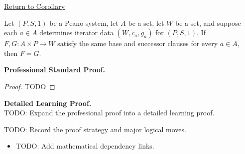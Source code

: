 \newpage
{}
\label{prf:uniqueness-of-binary-iterator-operations}

\begin{remark*}[Return]
\hyperref[cor:uniqueness-of-binary-iterator-operations]{Return to Corollary}
\end{remark*}

\begin{theorem*}
Let $(P,S,1)$ be a Peano system, let $A$ be a set, let $W$ be a set, and
suppose each $a\in A$ determines iterator data $(W,c_a,g_a)$ for $(P,S,1)$.
If $F,G:A\times P\to W$ satisfy the same base and successor clauses for every
$a\in A$, then $F=G$.
\end{theorem*}

\textbf{Professional Standard Proof.}~\\
\begin{proof}
TODO
\end{proof}

\textbf{Detailed Learning Proof.}~\\
TODO: Expand the professional proof into a detailed learning proof.

\begin{remark*}
TODO: Record the proof strategy and major logical moves.
\end{remark*}

\begin{dependencies}
\begin{itemize}
  \item TODO: Add mathematical dependency links.
\end{itemize}
\end{dependencies}
